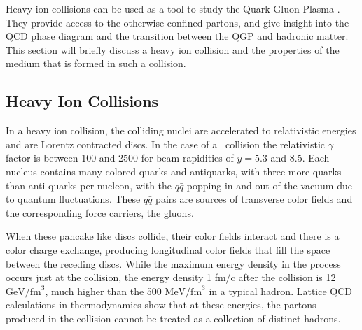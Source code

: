
Heavy ion collisions can be used as a tool to study the Quark Gluon Plasma \cite{SHURYAK198071} . They provide access to the otherwise confined partons, and give insight into the QCD phase diagram and the transition between the QGP and hadronic matter. This section will briefly discuss a heavy ion collision and the properties of the medium that is formed in such a collision.  

\subsection{Heavy Ion Collisions}
In a heavy ion collision, the colliding nuclei are accelerated to relativistic energies and are Lorentz contracted discs. In the case of a \pbpb\ collision the relativistic $\gamma$ factor is between 100 and 2500 for beam rapidities of $y = 5.3$ and 8.5. Each nucleus contains many colored quarks and antiquarks, with three more quarks than anti-quarks per nucleon, with the $q\bar{q}$ popping in and out of the vacuum due to quantum fluctuations. These $q\bar{q}$ pairs are sources of transverse color fields and the corresponding force carriers, the gluons. 

When these pancake like discs collide, their color fields interact and there is a color charge exchange, producing longitudinal color fields that fill the space between the receding discs. While the maximum energy density in the process occurs just at the collision, the energy density 1 fm/c after the collision is 12 $\mathrm{GeV} / \mathrm{fm}^3$, much higher than the 500 $\mathrm{MeV} / \mathrm{fm}^3$ in a typical hadron. Lattice QCD calculations in thermodynamics show that at these energies, the partons produced in the collision cannot be treated as a collection of distinct hadrons. 


